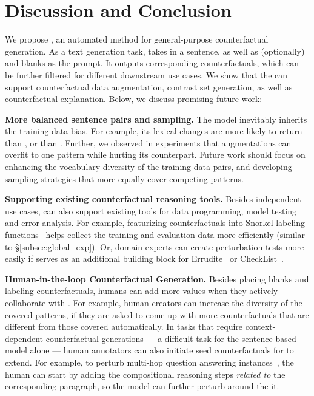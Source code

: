 \section{Discussion and Conclusion}
\label{sec:discuss}

We propose \sysname, an automated method for general-purpose counterfactual generation. 
As a text generation task, \sysname takes in a sentence, as well as (optionally) \tagstrs and blanks as the prompt.
It outputs corresponding counterfactuals, which can be further filtered for different downstream use cases. 
We show that the \sysname can support counterfactual data augmentation, contrast set generation, as well as counterfactual explanation.
Below, we discuss promising future work:

\textbf{More balanced sentence pairs and sampling.}
The \sysname model inevitably inherits the training data bias.
For example, its lexical changes are more likely to return  than , or  than .
Further, we observed in \qqp experiments that augmentations can overfit to one pattern while hurting its counterpart. 
Future work should focus on enhancing the vocabulary diversity of the training data pairs, and developing sampling strategies that more equally cover competing patterns.

\textbf{Supporting existing counterfactual reasoning tools.}
Besides independent use cases, \sysname can also support existing tools for data programming, model testing and error analysis.
For example, featurizing counterfactuals into Snorkel labeling functions~\cite{ratner2017snorkel} helps collect the training and evaluation data more efficiently (similar to \S\ref{subsec:global_exp}).
Or, domain experts can create perturbation tests more easily if \sysname serves as an additional building block for Errudite~\cite{wu2019errudite} or CheckList~\cite{checklist:acl20}.


\textbf{Human-in-the-loop Counterfactual Generation.}
Besides placing blanks and labeling counterfactuals, humans can add more values when they actively collaborate with \sysname.
For example, human creators can increase the diversity of the covered patterns, if they are asked to come up with more counterfactuals that are different from those covered automatically.
In tasks that require context-dependent counterfactual generations --- a difficult task for the sentence-based model alone --- human annotators can also initiate seed counterfactuals for \sysname to extend.
For example, to perturb multi-hop question answering instances~\cite{gardner2020contrast}, the human can start by adding the compositional reasoning steps \emph{related to} the corresponding paragraph, so the model can further perturb around the it.